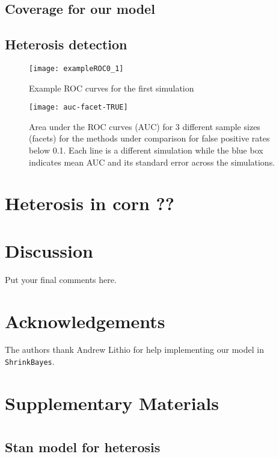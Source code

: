 \documentclass[useAMS,usenatbib,referee]{biom}
\begin{document}
\subsection{Coverage for our model}



\subsection{Heterosis detection}

\begin{figure}[htbp]
\centerline{\texttt{[image: exampleROC0\_1]}}
\caption{Example ROC curves for the first simulation}
\label{f:roc}
\end{figure}

\begin{figure}
\centerline{\texttt{[image: auc-facet-TRUE]}}
\caption{Area under the ROC curves (AUC) for 3 different sample sizes (facets) for the methods under comparison for false positive rates below 0.1. Each line is a different simulation while the blue box indicates mean AUC and its standard error across the simulations.}
\end{figure}

\section{Heterosis in corn ??}
\label{s:corn}

\section{Discussion}
\label{s:discuss}

Put your final comments here. 



\backmatter %



\section*{Acknowledgements}

The authors thank Andrew Lithio for help implementing our model in {\tt ShrinkBayes}.


\section*{Supplementary Materials}





\appendix


\section{}
\subsection{Stan model for heterosis}



\label{lastpage}
\end{document}
